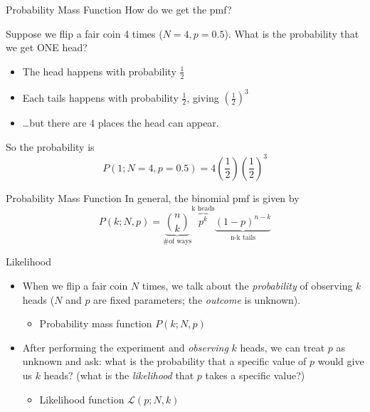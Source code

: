 \documentclass{beamer}
\begin{document}
\begin{frame}{Probability Mass Function}
How do we get the pmf? \par Suppose we flip a fair coin 4 times ($N=4, p = 0.5$). What is the probability that we get ONE head?
        \begin{itemize}
                \item The head happens with probability $\frac{1}{2}$
                \item Each tails happens with probability $\frac{1}{2}$, giving
                         $\left ( \frac{1}{2} \right )^3$
                \item \dots but there are $4$ places the head can appear.
        \end{itemize}
So the probability is 
        \[
                P(1;N=4,p=0.5) = 
                        4 \left ( \frac{1}{2} \right ) \left ( \frac{1}{2} \right )^3
        \]
\end{frame}

\begin{frame}{Probability Mass Function}
In general, the binomial pmf is given by
                \[
                P(k;N,p) = \underbrace{{n \choose k}}_{\text{\# of ways}}
                                \overbrace{p^k}^{\text{k heads}}
                                \underbrace{(1-p)^{n-k}}_{\text{n-k tails}}
                \]
\end{frame}

\begin{frame}{Likelihood}
        \begin{itemize}
                \item When we flip a fair coin $N$ times, we talk about the \emph{probability} of observing $k$ heads ($N$ and $p$ are fixed parameters; the \emph{outcome} is unknown).
                        \begin{itemize}
                                \item Probability mass function $P(k;N,p)$
                        \end{itemize}
                \item After performing the experiment and \emph{observing} $k$ heads, we can treat $p$ as unknown and ask: what is the probability that a specific value of $p$ would give us $k$ heads? (what is the \emph{likelihood} that $p$ takes a specific value?)
                        \begin{itemize}
                                \item Likelihood function $\mathcal{L}(p;N,k)$
                        \end{itemize}
        \end{itemize}
\end{frame}
\end{document}
